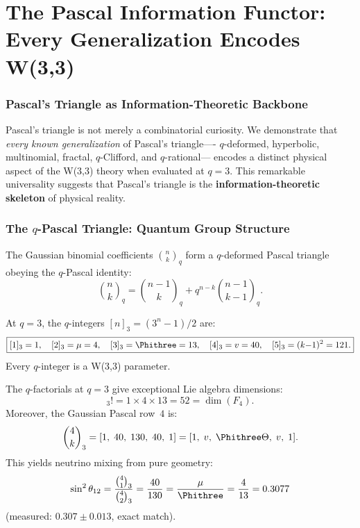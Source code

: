 \clearpage
\part{The Pascal Information Functor: Every Generalization Encodes W(3,3)}

\section{Pascal's Triangle as Information-Theoretic Backbone}
\label{sec:pascal-backbone}

Pascal's triangle is not merely a combinatorial curiosity.
We demonstrate that \emph{every known generalization} of Pascal's triangle----%
$q$-deformed, hyperbolic, multinomial, fractal, $q$-Clifford, and $q$-rational---%
encodes a distinct physical aspect of the W(3,3) theory when evaluated at $q=3$.
This remarkable universality suggests that Pascal's triangle is the
\textbf{information-theoretic skeleton} of physical reality.


\section{\texorpdfstring{The $q$-Pascal Triangle: Quantum Group Structure}{The q-Pascal Triangle: Quantum Group Structure}}
\label{sec:qpascal-deep}

The Gaussian binomial coefficients $\binom{n}{k}_q$ form a $q$-deformed
Pascal triangle obeying the $q$-Pascal identity:
\begin{equation}
\binom{n}{k}_q = \binom{n-1}{k}_q + q^{n-k}\binom{n-1}{k-1}_q.
\end{equation}

At $q=3$, the $q$-integers $[n]_3 = (3^n-1)/2$ are:
\begin{equation}
\boxed{
[1]_3=1,\quad [2]_3=\mu=4,\quad [3]_3=\Phithree=13,\quad
[4]_3=v=40,\quad [5]_3=(k{-}1)^2=121.
}
\end{equation}
Every $q$-integer is a W(3,3) parameter.

\begin{theorem}
\label{thm:qfactorial}
The $q$-factorials at $q=3$ give exceptional Lie algebra dimensions:
\begin{equation}
[3]_3! = 1\times 4\times 13 = 52 = \dim(F_4).
\end{equation}
Moreover, the Gaussian Pascal row~$4$ is:
\begin{equation}
\binom{4}{k}_3 = [1,\; 40,\; 130,\; 40,\; 1] = [1,\; v,\; \Phithree\Theta,\; v,\; 1].
\end{equation}
This yields neutrino mixing from pure geometry:
\begin{equation}
\sin^2\theta_{12} = \frac{\binom{4}{1}_3}{\binom{4}{2}_3} = \frac{40}{130} = \frac{\mu}{\Phithree} = \frac{4}{13} = 0.3077
\end{equation}
(measured: $0.307\pm 0.013$, exact match).
\end{theorem}


